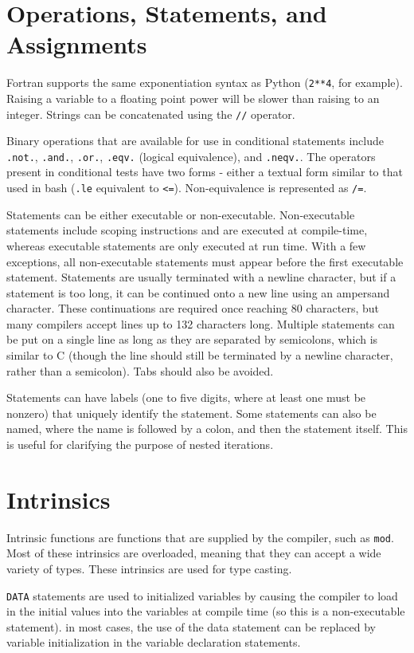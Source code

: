 \documentclass[10pt]{article}
\begin{document}
\section{Operations, Statements, and Assignments}
Fortran supports the same exponentiation syntax as Python ({\tt 2**4}, for example). Raising a variable to a floating point power will be slower than raising to an integer. Strings can be concatenated using the {\tt //} operator.

Binary operations that are available for use in conditional statements include {\tt .not.}, {\tt .and.}, {\tt .or.}, {\tt .eqv.} (logical equivalence), and {\tt .neqv.}. The operators present in conditional tests have two forms - either a textual form similar to that used in bash ({\tt .le} equivalent to {\tt <=}). Non-equivalence is represented as {\tt /=}. 

Statements can be either executable or non-executable. Non-executable statements include scoping instructions and are executed at compile-time, whereas executable statements are only executed at run time. With a few exceptions, all non-executable statements must appear before the first executable statement. Statements are usually terminated with a newline character, but if a statement is too long, it can be continued onto a new line using an ampersand character. These continuations are required once reaching 80 characters, but many compilers accept lines up to 132 characters long. Multiple statements can be put on a single line as long as they are separated by semicolons, which is similar to C (though the line should still be terminated by a newline character, rather than a semicolon). Tabs should also be avoided.

Statements can have labels (one to five digits, where at least one must be nonzero) that uniquely identify the statement. Some statements can also be named, where the name is followed by a colon, and then the statement itself. This is useful for clarifying the purpose of nested iterations.

\section{Intrinsics}
Intrinsic functions are functions that are supplied by the compiler, such as {\tt mod}. Most of these intrinsics are overloaded, meaning that they can accept a wide variety of types. These intrinsics are used for type casting.

{\tt DATA} statements are used to initialized variables by causing the compiler to load in the initial values into the variables at compile time (so this is a non-executable statement). in most cases, the use of the data statement can be replaced by variable initialization in the variable declaration statements. 
\end{document}
